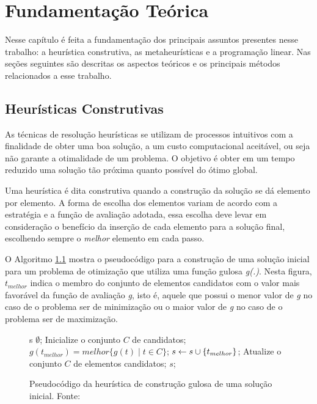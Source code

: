 \chapter{Fundamentação Teórica}

  Nesse capítulo é feita a fundamentação dos principais assuntos presentes nesse
  trabalho: a heurística construtiva, as metaheurísticas e a programação
  linear. Nas seções seguintes são descritas os aspectos teóricos e os
  principais métodos relacionados a esse trabalho.

	\section{Heurísticas Construtivas}
		As técnicas de resolução heurísticas se utilizam de processos intuitivos com a finalidade de obter uma boa solução, a um custo computacional aceitável, ou seja não garante a otimalidade de um problema. O objetivo é obter em um tempo reduzido uma solução tão próxima quanto possível do ótimo global. 
		
		Uma heurística é dita construtiva quando a construção da solução se dá elemento por elemento. A forma de escolha dos elementos variam de acordo com a estratégia e a função de avaliação adotada, essa escolha deve levar em consideração o benefício da inserção de cada elemento para a solução final, escolhendo sempre o \emph{melhor} elemento em cada passo.
		
		O Algoritmo \ref{alg:heurconsgulosa} mostra o pseudocódigo para a construção de uma solução inicial para um problema de otimização que utiliza uma função gulosa \emph{g(.)}. Nesta figura, \emph{$t_{melhor}$} indica o membro do conjunto de elementos candidatos com o valor mais favorável da função de avaliação \emph{g}, isto é, aquele que possui o menor valor de \emph{g} no caso de o problema ser de minimização ou o maior valor de \emph{g} no caso de o problema ser de maximização.


\begin{figure}[h]
\caption{Pseudocódigo da heurística de construção gulosa de uma solução
inicial. \mbox{Fonte:
\cite{notasmarcone}} }\label{alg:heurconsgulosa}
\begin{programma}
\STATE s \GETS $\emptyset$;
\STATE Inicialize o conjunto $C$ de candidatos;
\STATE $g(t_{melhor}) = melhor\{g(t) \mid t \in C\}$;
\STATE $s \leftarrow s \cup \{t_{melhor}\}$;
\STATE Atualize o conjunto $C$ de elementos candidatos;
\ENDWHILE
\STATE\RETURN $s$;
\ENDALGORITHM
\end{programma}
\end{figure}		
		


